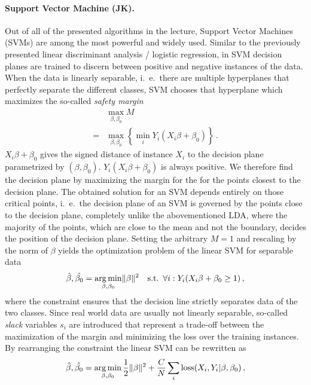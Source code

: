 \documentclass[12pt, a4paper]{scrartcl}
\DeclareMathOperator*{\argmin}{arg\,min}
\DeclarePairedDelimiter\norm{\lVert}{\rVert}
\begin{document}
\paragraph{Support Vector Machine (JK).} Out of all of the presented algorithms in the lecture, Support Vector Machines (SVMs) are among the most powerful and widely used. Similar to the previously presented linear discriminant analysis / logistic regression, in SVM decision planes are trained to discern between positive and negative instances of the data. When the data is linearly separable, i.\ e.\ there are multiple hyperplanes that perfectly separate the different classes, SVM chooses that hyperplane which maximizes the so-called \emph{safety margin}
\begin{align}
	&\max_{\beta, \beta_0} M \\
	= &	\max_{\beta, \beta_0} \left\{ \min_i Y_i ( X_i \beta + \beta_0) \right\} \, .
\end{align}
$X_i \beta + \beta_0$ gives the signed distance of instance $X_i$ to the decision plane parametrized by $(\beta, \beta_0)$. $Y_i (X_i \beta + \beta_0)$ is always positive. 
We therefore find the decision plane by maximizing the margin for the for the points closest to the decision plane. The obtained solution for an SVM depends entirely on those critical points, i.\ e.\ the decision plane of an SVM is governed by the points close to the decision plane, completely unlike the abovementioned LDA, where the majority of the points, which are close to the mean and not the boundary, decides the position of the decision plane. 
Setting the arbitrary $M=1$ and rescaling by the norm of $\beta$ yields the optimization problem of the linear SVM for separable data
\begin{align}
	\hat{\beta}, \hat{\beta_0} = \argmin_{\beta, \beta_0}  \norm{ \beta}^2 
	\quad \text{s.t.} \enspace \forall i: Y_i (X_i \beta + \beta_0 \ge 1) \, ,
\end{align}
where the constraint ensures that the decision line strictly separates data of the two classes.
Since real world data are usually not linearly separable, so-called \emph{slack} variables $s_i$ are introduced that represent a trade-off between the maximization of the margin and minimizing the loss over the training instances. 
By rearranging the constraint the linear SVM can be rewritten as
\begin{align}
	\hat{\beta}, \hat{\beta_0} = \argmin_{\beta, \beta_0} \frac{1}{2} \norm{ \beta }^2 + \frac{C}{N} \sum_i \text{loss} (X_i, Y_i | \beta, \beta_0) \, ,
\end{align}
\end{document}
